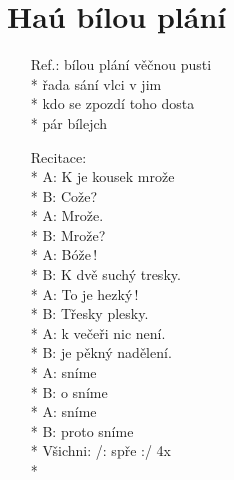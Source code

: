 \section{Haú bílou plání}
\begin{enumerate}
\item[Ref.:]  bílou plání věčnou pusti \\*
 řada sání vlci v  jim   \\*
 kdo se zpozdí toho dosta \\*
 pár bílejch    
\item[] Recitace: \\*
A: K  je kousek mrože \\*
B: Cože? \\*
A: Mrože. \\*
B: Mrože? \\*
A: Bóže\,! \\*
B: K  dvě suchý tresky. \\*
A: To je hezký\,! \\*
B: Třesky plesky. \\*
A:  k večeři nic není. \\*
B:  je pěkný nadělení. \\*
A:  sníme \\*
B: o sníme \\*
A:  sníme \\*
B: proto sníme \\*
Všichni: /:  spře :/           4x \\*
\end{enumerate}
